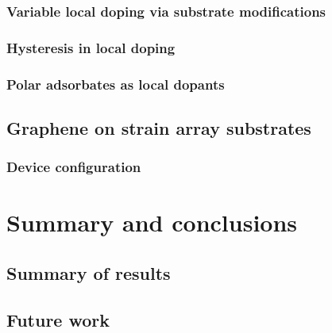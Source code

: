 \documentclass[edeposit,fullpage,draftthesis]{uiucthesis2009}
\begin{document}
    \subsection{Variable local doping via substrate modifications}
    \subsection{Hysteresis in local doping}
    \subsection{Polar adsorbates as local dopants}

\section{Graphene on strain array substrates}
    \subsection{Device configuration}


\chapter{Summary and conclusions}
\section{Summary of results}
\section{Future work}
\end{document}

